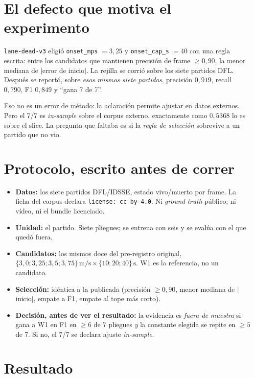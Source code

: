 \documentclass[11pt,a4paper]{article}
\begin{document}
\section{El defecto que motiva el experimento}

\texttt{lane-dead-v3} eligió \texttt{onset\_mps} $=3{,}25$ y \texttt{onset\_cap\_s} $=40$ con una
regla escrita: entre los candidatos que mantienen precisión de frame $\geq 0{,}90$, la menor
mediana de $|$error de inicio$|$. La rejilla se corrió sobre los siete partidos DFL. Después se
reportó, sobre \emph{esos mismos siete partidos}, precisión $0{,}919$, recall $0{,}790$,
F1 $0{,}849$ y ``gana 7 de 7''.

Eso no es un error de método: la aclaración permite ajustar en datos externos. Pero el 7/7 es
\emph{in-sample} sobre el corpus externo, exactamente como $0{,}5368$ lo es sobre el slice. La
pregunta que faltaba es si la \emph{regla de selección} sobrevive a un partido que no vio.

\section{Protocolo, escrito antes de correr}

\begin{itemize}
\item \textbf{Datos:} los siete partidos DFL/IDSSE, estado vivo/muerto por frame. La ficha
del corpus declara \texttt{license: cc-by-4.0}. Ni \emph{ground truth} público, ni vídeo, ni el
bundle licenciado.
\item \textbf{Unidad:} el partido. Siete pliegues; se entrena con seis y se evalúa con el que
quedó fuera.
\item \textbf{Candidatos:} los mismos doce del pre-registro original,
$\{3{,}0;3{,}25;3{,}5;3{,}75\}\,\text{m/s}\times\{10;20;40\}\,\text{s}$. W1 es la referencia,
no un candidato.
\item \textbf{Selección:} idéntica a la publicada (precisión $\geq 0{,}90$, menor mediana de
$|$inicio$|$, empate a F1, empate al tope más corto).
\item \textbf{Decisión, antes de ver el resultado:} la evidencia es \emph{fuera de muestra} si
gana a W1 en F1 en $\geq 6$ de 7 pliegues \emph{y} la constante elegida se repite en $\geq 5$ de
7. Si no, el 7/7 se declara ajuste \emph{in-sample}.
\end{itemize}

\section{Resultado}
\end{document}
